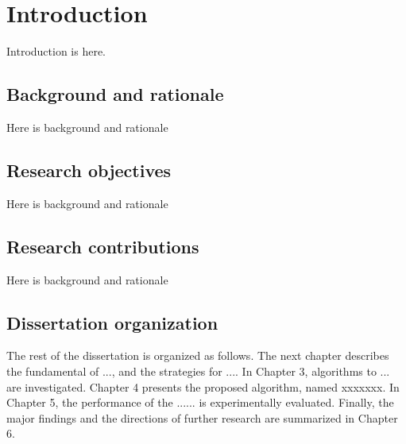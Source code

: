 \documentclass[../main/thesis.tex]{subfiles}
\begin{document}
\chapter{Introduction}
\label{ch:1}
Introduction is here.

\section{Background and rationale}
Here is background and rationale

\section{Research objectives}
Here is background and rationale

\section{Research contributions}
Here is background and rationale

\section{Dissertation organization}
The rest of the dissertation is organized as follows. The next chapter describes the fundamental of ..., and the strategies for .... In Chapter 3, algorithms to ... are investigated. Chapter 4 presents the proposed algorithm, named xxxxxxx. In Chapter 5, the performance of the ...... is experimentally evaluated. Finally, the major findings and the directions of further research are summarized in Chapter 6.

\bib
\end{document}
